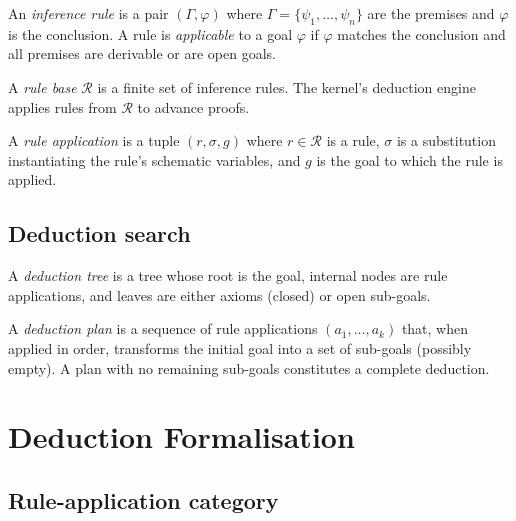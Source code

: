 \documentclass[11pt]{article}
\begin{document}
An \emph{inference rule} is a pair
$(\Gamma, \varphi)$ where $\Gamma = \{\psi_1, \ldots, \psi_n\}$
are the premises and $\varphi$ is the conclusion.  A rule is
\emph{applicable} to a goal $\varphi$ if $\varphi$ matches
the conclusion and all premises are derivable or are open goals.

\begin{definition}\label{def:rulebase}
A \emph{rule base} $\mathcal{R}$ is a finite set of inference
rules.  The kernel's deduction engine applies rules from
$\mathcal{R}$ to advance proofs.
\end{definition}

\begin{definition}\label{def:ruleapp}
A \emph{rule application} is a tuple $(r, \sigma, g)$ where
$r \in \mathcal{R}$ is a rule, $\sigma$ is a substitution
instantiating the rule's schematic variables, and $g$ is the
goal to which the rule is applied.
\end{definition}

\subsection{Deduction search}

\begin{definition}\label{def:dedtree}
A \emph{deduction tree} is a tree whose root is the goal,
internal nodes are rule applications, and leaves are either
axioms (closed) or open sub-goals.
\end{definition}

\begin{definition}\label{def:dedplan}
A \emph{deduction plan} is a sequence of rule applications
$(a_1, \ldots, a_k)$ that, when applied in order, transforms
the initial goal into a set of sub-goals (possibly empty).
A plan with no remaining sub-goals constitutes a complete
deduction.
\end{definition}

\section{Deduction Formalisation}\label{sec:deduction}

\subsection{Rule-application category}
\end{document}
